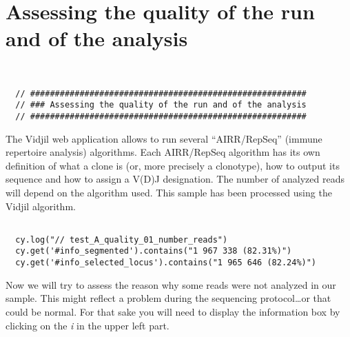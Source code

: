 
\section{Assessing the quality of the run and of the analysis}
\label{sec:run-quality}
\begin{verbatim}


  // ########################################################
  // ### Assessing the quality of the run and of the analysis
  // ########################################################

\end{verbatim}

The Vidjil web application allows to run several ``AIRR/RepSeq'' (immune repertoire analysis) algorithms.
Each AIRR/RepSeq algorithm has its own definition of what a clone is (or, more precisely
a clonotype), how to output its sequence and how to assign a V(D)J designation.
The number of analyzed reads will depend on the algorithm used.
This sample has been processed using the Vidjil algorithm.


\begin{verbatim}

  cy.log("// test_A_quality_01_number_reads")
  cy.get('#info_segmented').contains("1 967 338 (82.31%)")
  cy.get('#info_selected_locus').contains("1 965 646 (82.24%)")

\end{verbatim}

Now we will try to assess the reason why some reads were not analyzed in our
sample.
This might reflect a problem during the sequencing protocol\dots or that could
be normal.
For that sake you will need to display the information box by clicking on the
\textit{i} in the upper left part.

